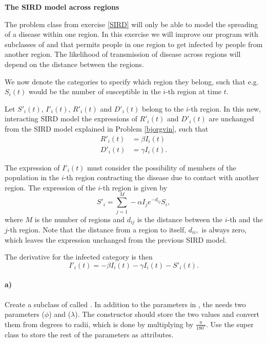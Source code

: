 \begin{Problem}{\textbf{The SIRD model across regions}} \label{SIRD_interaction}   

\noindent
The problem class from exercise \ref{SIRD} will only be able to model the spreading of a disease within one region. In this exercise we will improve our program with subclasses of  and  that permits  people in one region to get infected by people from another region. The likelihood of transmission of disease across regions  will depend on the distance between the regions.

We now denote the categories to specify which region they belong, such that e.g.  $S_i (t)$ would be the number of susceptible in the $i$-th region at time $t$. 

Let $S'_i(t)$, $I'_i (t)$, $R'_i(t)$ and $D'_i(t)$ belong to the $i$-th region. In this new, interacting SIRD model the expressions of $R'_i(t)$ and $D'_i(t)$ are unchanged from the SIRD model explained in Problem \ref{bjorgvin}, such that 
\begin{align*}
    R'_i (t) &= \beta I_i (t) \\
    D'_i (t) &= \gamma I_i (t) .
\end{align*}

The expression of  $I'_i (t)$ must consider the possibility of members of the population in the $i$-th region contracting the disease due to contact with another region. The expression of the $i$-th region is given by
\begin{equation*}
    S'_i = \sum_{j=1}^{M}-\alpha I_j e^{-d_{ij}}  S_i  ,    
\end{equation*}
where $M$ is the number of regions and  $d_{ij}$ is the distance between the $i$-th and the $j$-th region. Note that the distance from a region to itself, $d_{ii},$ is always zero, which leaves the expression unchanged from the previous SIRD model. 

The derivative for the infected category is then
\begin{equation*}
   I'_i (t) = -\beta I_i(t) - \gamma I_i (t) - S'_i (t) .
\end{equation*}

\paragraph{a)}
Create a subclass of  called . In addition to the parameters in , the  needs two parameters  ($\phi$)  and  ($\lambda$). The constructor should store the two values and convert them from degrees to radii, which is done by multiplying by $\frac{\pi}{180^{\circ}}$. Use the super class to store the rest of the parameters as attributes. 


\end{Problem}
